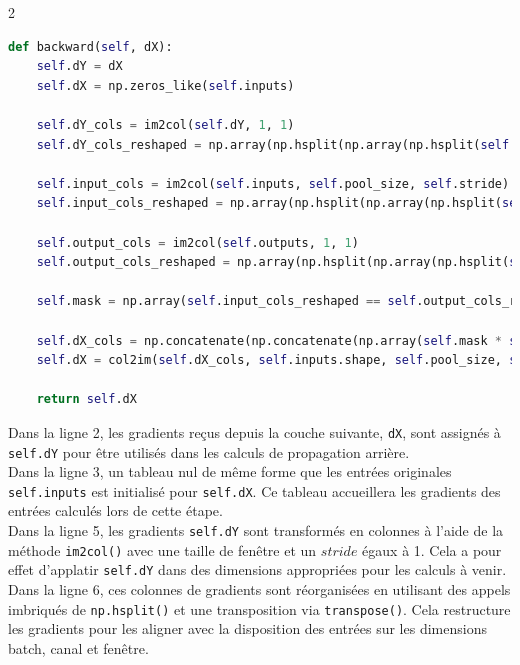 \begin{multicols}{2}
\begin{lstlisting}[language=Python]
def backward(self, dX):
    self.dY = dX
    self.dX = np.zeros_like(self.inputs)

    self.dY_cols = im2col(self.dY, 1, 1)
    self.dY_cols_reshaped = np.array(np.hsplit(np.array(np.hsplit(self.dY_cols, self.dY.shape[0])), self.dY.shape[1])).transpose(0, 1, 3, 2)

    self.input_cols = im2col(self.inputs, self.pool_size, self.stride)
    self.input_cols_reshaped = np.array(np.hsplit(np.array(np.hsplit(self.input_cols, self.inputs.shape[0])), self.inputs.shape[1])).transpose(0, 1, 3, 2)

    self.output_cols = im2col(self.outputs, 1, 1)
    self.output_cols_reshaped = np.array(np.hsplit(np.array(np.hsplit(self.output_cols, self.inputs.shape[0])), self.inputs.shape[1])).transpose(0, 1, 3, 2)

    self.mask = np.array(self.input_cols_reshaped == self.output_cols_reshaped, dtype=np.uint64)

    self.dX_cols = np.concatenate(np.concatenate(np.array(self.mask * self.dY_cols_reshaped).transpose(0, 1, 3, 2), axis=1), axis=1)
    self.dX = col2im(self.dX_cols, self.inputs.shape, self.pool_size, self.stride)

    return self.dX
\end{lstlisting}
\hfill\break

Dans la ligne 2, les gradients reçus depuis la couche suivante, 
\texttt{dX}, sont assignés à \texttt{self.dY} pour être utilisés dans les calculs de 
propagation arrière. \\

Dans la ligne 3, un tableau nul de même forme que les entrées originales \texttt{self.inputs} est initialisé 
pour \texttt{self.dX}. Ce tableau accueillera les gradients des entrées calculés lors de cette étape. \\

Dans la ligne 5, les gradients \texttt{self.dY} sont transformés en colonnes à l’aide de la méthode \texttt{im2col()} 
avec une taille de fenêtre et un $stride$ égaux à 1. Cela a pour effet d'applatir 
\texttt{self.dY} dans des dimensions appropriées pour les calculs à venir. \\

Dans la ligne 6, ces colonnes de gradients sont réorganisées en utilisant des appels imbriqués de \texttt{np.hsplit()} et une 
transposition via \texttt{transpose()}. Cela restructure les gradients pour les aligner avec la disposition 
des entrées sur les dimensions batch, canal et fenêtre. \\


\end{multicols}
